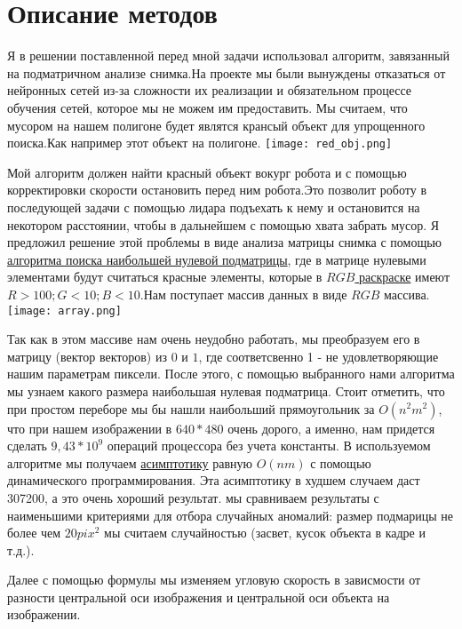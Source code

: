 \documentclass{article}
\begin{document}
\section{Описание методов}
        \qquad Я в решении поставленной перед мной задачи использовал алгоритм, завязанный на подматричном анализе снимка.На проекте мы были вынуждены отказаться от нейронных сетей из-за сложности их реализации и обязательном процессе обучения сетей, которое мы не можем им предоставить. Мы считаем, что мусором на нашем полигоне будет являтся крансый объект для упрощенного поиска.Как например этот объект на полигоне.
    \texttt{[image: red\_obj.png]}
    \par Мой алгоритм должен найти красный объект вокург робота и с помощью корректировки скорости остановить перед ним  робота.Это позволит роботу в последующей задачи с помощью лидара подъехать к нему и остановится на некотором расстоянии, чтобы в дальнейшем с помощью хвата забрать мусор. Я предложил решение этой проблемы в виде анализа матрицы снимка с помощью \textcolor{blue}{\href{https://e-maxx.ru/algo/maximum_zero_submatrix    }{алгоритма поиска наибольшей нулевой подматрицы}}, где в матрице нулевыми элементами будут считаться красные элементы, которые в \textcolor{blue}{\href{ https://en.wikipedia.org/wiki/RGB_color_model    }{$RGB$ раскраске}} имеют $R>100; G<10; B<10$.Нам поступает массив данных в виде $RGB$ массива.\newline
        \texttt{[image: array.png]}
        \par Так как в этом массиве нам очень неудобно работать, мы преобразуем его в матрицу (вектор векторов) из $0$ и $1$, где соответсвенно 1 - не удовлетворяющие нашим параметрам пиксели. После этого, с помощью выбранного нами алгоритма мы узнаем какого размера наибольшая нулевая подматрица. Стоит отметить, что при простом переборе мы бы нашли наибольший прямоугольник за $O(n^2m^2)$, что при нашем изображении в $640*480$ очень дорого, а именно, нам придется сделать $9,43*10^9$ операций процессора без учета константы. В используемом алгоритме мы получаем  \textcolor{blue}{\href{https://en.wikipedia.org/wiki/Asymptotic_analysis   }{асимптотику}} равную $O(nm)$ с помощью динамического  программирования. Эта асимптотику в худшем случаем даст 307200, а это очень хороший результат.  мы сравниваем результаты с наименьшими критериями для отбора случайных аномалий: размер подмарицы не более чем $20pix^2$ мы считаем случайностью (засвет, кусок объекта в кадре и т.д.).
        \par Далее с помощью формулы мы изменяем угловую скорость в зависмости от разности центральной оси изображения и центральной оси объекта на изображении.
\end{document}
